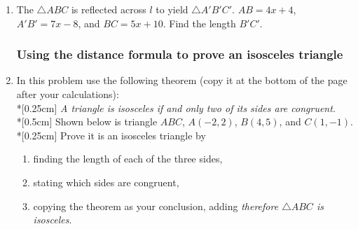 \documentclass[12pt, twoside]{article}
\begin{document}
\begin{enumerate}
  \item The $\triangle ABC$ is reflected across $l$ to yield $\triangle A'B'C'$. $AB=4x+4$, $A'B'=7x-8$, and $BC=5x+10$. Find the length $B'C'$. %
    \begin{flushright}
  \end{flushright}

\newpage
  \subsubsection*{Using the distance formula to prove an isosceles triangle}
    \item In this problem use the following theorem (copy it at the bottom of the page after your calculations): \\*[0.25cm]
    \emph{A triangle is isosceles if and only two of its sides are congruent.}\\*[0.5cm]
    Shown below is triangle $ABC$, $A(-2,2)$, $B(4,5)$, and $C(1,-1)$. \\*[0.25cm]
    Prove it is an isosceles triangle by
    \begin{enumerate}
      \item finding the length of each of the three sides,
      \item stating which sides are congruent,
      \item copying the theorem as your conclusion, adding \emph{therefore $\triangle ABC$ is isosceles}.
    \end{enumerate}
    \begin{flushright} %
    \end{flushright}


\end{enumerate}
\end{document}
